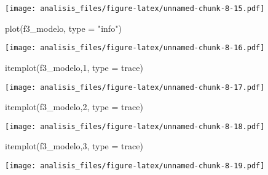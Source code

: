 \documentclass[
]{article}
\newenvironment{Shaded}{\begin{snugshade}}{\end{snugshade}}
\newcommand{\AttributeTok}[1]{\textcolor[rgb]{0.77,0.63,0.00}{#1}}
\newcommand{\DecValTok}[1]{\textcolor[rgb]{0.00,0.00,0.81}{#1}}
\newcommand{\FunctionTok}[1]{\textcolor[rgb]{0.00,0.00,0.00}{#1}}
\newcommand{\NormalTok}[1]{#1}
\newcommand{\StringTok}[1]{\textcolor[rgb]{0.31,0.60,0.02}{#1}}
\begin{document}
\texttt{[image: analisis\_files/figure-latex/unnamed-chunk-8-15.pdf]}

\begin{Shaded}
\begin{Highlighting}[]
\FunctionTok{plot}\NormalTok{(f3\_modelo,  }\AttributeTok{type =} \StringTok{"info"}\NormalTok{)}
\end{Highlighting}
\end{Shaded}

\texttt{[image: analisis\_files/figure-latex/unnamed-chunk-8-16.pdf]}

\begin{Shaded}
\begin{Highlighting}[]
\FunctionTok{itemplot}\NormalTok{(f3\_modelo,}\DecValTok{1}\NormalTok{, }\AttributeTok{type =} \StringTok{\textquotesingle{}trace\textquotesingle{}}\NormalTok{)}
\end{Highlighting}
\end{Shaded}

\texttt{[image: analisis\_files/figure-latex/unnamed-chunk-8-17.pdf]}

\begin{Shaded}
\begin{Highlighting}[]
\FunctionTok{itemplot}\NormalTok{(f3\_modelo,}\DecValTok{2}\NormalTok{, }\AttributeTok{type =} \StringTok{\textquotesingle{}trace\textquotesingle{}}\NormalTok{)}
\end{Highlighting}
\end{Shaded}

\texttt{[image: analisis\_files/figure-latex/unnamed-chunk-8-18.pdf]}

\begin{Shaded}
\begin{Highlighting}[]
\FunctionTok{itemplot}\NormalTok{(f3\_modelo,}\DecValTok{3}\NormalTok{, }\AttributeTok{type =} \StringTok{\textquotesingle{}trace\textquotesingle{}}\NormalTok{)}
\end{Highlighting}
\end{Shaded}

\texttt{[image: analisis\_files/figure-latex/unnamed-chunk-8-19.pdf]}
\end{document}
